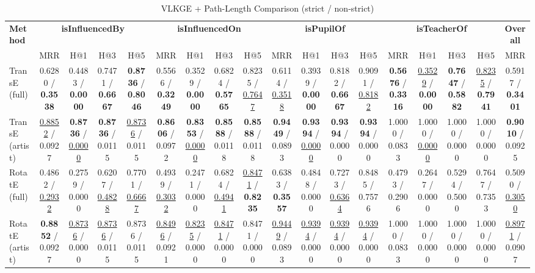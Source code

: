\begin{table}[ht]
\centering
\caption{VLKGE + Path-Length Comparison (strict / non-strict)}
\label{tab:vlkge_compare}
\begin{tabular}{lccccccccccccccccc}
\toprule
\textbf{Method} & \multicolumn{4}{c}{\textbf{isInfluencedBy}} & \multicolumn{4}{c}{\textbf{isInfluencedOn}} & \multicolumn{4}{c}{\textbf{isPupilOf}} & \multicolumn{4}{c}{\textbf{isTeacherOf}} & \textbf{Overall} \\
\cmidrule(lr){2-5} \cmidrule(lr){6-9} \cmidrule(lr){10-13} \cmidrule(lr){14-17}
 & MRR & H@1 & H@3 & H@5 & MRR & H@1 & H@3 & H@5 & MRR & H@1 & H@3 & H@5 & MRR & H@1 & H@3 & H@5 & MRR \\
\midrule
TransE (full) & 0.6280 / \textbf{0.3538} & 0.4483 / \textbf{0.0000} & 0.7471 / \textbf{0.6667} & \textbf{0.8736} / \textbf{0.8046} & 0.5566 / \textbf{0.3249} & 0.3529 / \textbf{0.0000} & 0.6824 / \textbf{0.5765} & 0.8235 / \underline{0.7647} & 0.6114 / \underline{0.3518} & 0.3939 / \textbf{0.0000} & 0.8182 / \textbf{0.6667} & 0.9091 / \underline{0.8182} & \textbf{0.5676} / \textbf{0.3316} & \underline{0.3529} / \textbf{0.0000} & \textbf{0.7647} / \textbf{0.5882} & \underline{0.8235} / \textbf{0.7941} & 0.5917 / \textbf{0.3401} \\
TransE (artist) & \underline{0.8852} / 0.0927 & \textbf{0.8736} / \underline{0.0000} & \textbf{0.8736} / 0.0115 & \underline{0.8736} / 0.0115 & \textbf{0.8606} / 0.0972 & \textbf{0.8353} / \underline{0.0000} & \textbf{0.8588} / 0.0118 & \textbf{0.8588} / 0.0118 & \textbf{0.9449} / 0.0893 & \textbf{0.9394} / \underline{0.0000} & \textbf{0.9394} / 0.0000 & \textbf{0.9394} / 0.0000 & 1.0000 / 0.0833 & 1.0000 / \underline{0.0000} & 1.0000 / 0.0000 & 1.0000 / 0.0000 & \textbf{0.9010} / 0.0925 \\
RotatE (full) & 0.4862 / \underline{0.2932} & 0.2759 / 0.0000 & 0.6207 / \underline{0.4828} & 0.7701 / \underline{0.6667} & 0.4939 / \underline{0.3032} & 0.2471 / 0.0000 & 0.6824 / \underline{0.4941} & \underline{0.8471} / \textbf{0.8235} & 0.6383 / \textbf{0.3557} & 0.4848 / 0.0000 & 0.7273 / \underline{0.6364} & 0.8485 / 0.7576 & 0.4793 / 0.2906 & 0.2647 / 0.0000 & 0.5294 / 0.5000 & 0.7647 / 0.7353 & 0.5090 / \underline{0.3050} \\
RotatE (artist) & \textbf{0.8852} / 0.0927 & \underline{0.8736} / 0.0000 & \underline{0.8736} / 0.0115 & 0.8736 / 0.0115 & \underline{0.8496} / 0.0921 & \underline{0.8235} / 0.0000 & \underline{0.8471} / 0.0000 & 0.8471 / 0.0000 & \underline{0.9449} / 0.0893 & \underline{0.9394} / 0.0000 & \underline{0.9394} / 0.0000 & \underline{0.9394} / 0.0000 & 1.0000 / 0.0833 & 1.0000 / 0.0000 & 1.0000 / 0.0000 & 1.0000 / 0.0000 & \underline{0.8971} / 0.0907 \\

\end{tabular}
\end{table}

